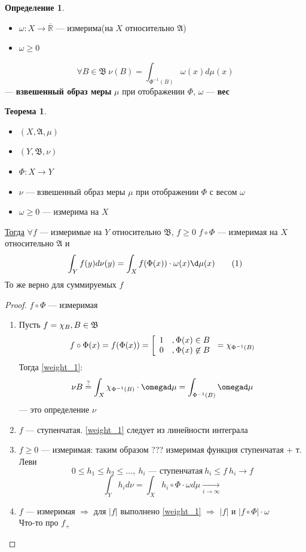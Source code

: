 \documentclass[oneside]{book}
\newcommand\addtag{\refstepcounter{equation}\tag{\theequation}}
\newcommand{\R}{\mathbb{R}}
\newcommand{\A}{\mathfrak{A}}
\newcommand{\B}{\mathfrak{B}}
\theoremstyle{plain}
\theoremstyle{remark}
\theoremstyle{definition}
\newtheorem{theorem}{Теорема}[section]
\newtheorem*{definition}{Определение}
\begin{document}
\begin{definition}
\-
\begin{itemize}
\item \(\omega: X\to\overline{\R}\) --- измерима(на \(X\) относительно \(\A\))
\item \(\omega \ge 0\)
\end{itemize}
\[ \forall B \in \B\ \nu(B) = \int_{\Phi^{-1}(B)}\omega(x)d\mu(x) \]
--- \textbf{взвешенный образ меры} \(\mu\) при отображении \(\Phi\), \(\omega\) --- \textbf{вес}
\end{definition}
\begin{theorem}
\-
\begin{itemize}
\item \((X, \A, \mu)\)
\item \((Y, \B, \nu)\)
\item \(\Phi: X \to Y\)
\item \(\nu\) --- взвешенный образ меры \(\mu\) при отображении \(\Phi\) с весом \(\omega\)
\item \(\omega \ge 0\) --- измерима на \(X\)
\end{itemize}
\uline{Тогда} \(\forall f\) --- измеримые на \(Y\) относительно \(\B\), \(f \ge 0\) \(f\circ \Phi\) --- измеримая на \(X\) относительно \(\A\) и
\[ \int_Y f(y) d\nu(y) = \int_X f(\Phi(x))\cdot\omega(x)\d\mu(x) \label{weight_1}\addtag \]
То же верно для суммируемых \(f\)
\end{theorem}
\begin{proof}
\(f\circ \Phi\) --- измеримая \\
\begin{enumerate}
\item Пусть \(f = \X_B, B \in \B\)
\[ f\circ \Phi(x) = f(\Phi(x)) = \left[\begin{array}{ll} 1 & ,\Phi(x) \in B \\ 0 & ,\Phi(x) \not\in B\end{array}\right. =\chi_{\Phi^{-1}(B)} \]
Тогда \ref{weight_1}:
\[ \nu B \overset{?}{=} \int_X \X_{\Phi^{-1}(B)}\cdot\omegad\mu = \int_{\Phi^{-1}(B)}\omegad\mu  \]
--- это определение \(\nu\)
\item \(f\) --- ступенчатая. \ref{weight_1} следует из линейности интеграла
\item \(f \ge 0\) --- измеримая: таким образом ??? измеримая функция ступенчатая + т. Леви
\[ 0 \le h_1 \le h_2 \le \dots,\ h_i\text{ --- ступенчатая}\ h_i \le f\ h_i \to f \]
\[ \int_Y h_i d\nu = \int_X h_i \circ \Phi\cdot\omega d\mu \xrightarrow[i \to \infty]{} \]
\item \(f\) --- измеримая \(\Rightarrow\) для \(|f|\) выполнено \ref{weight_1} \(\Rightarrow\) \(|f|\) и \(|f\circ \Phi|\cdot \omega\) \\
\color{red}Что-то про \(f_+\) \color{black}
\end{enumerate}
\end{proof}
\end{document}
